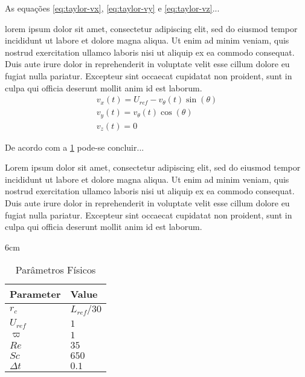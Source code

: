 As equações \eqref{eq:taylor-vx}, \eqref{eq:taylor-vy} e \eqref{eq:taylor-vz}...

lorem ipsum dolor sit amet, consectetur adipiscing elit, sed do eiusmod tempor incididunt ut labore et dolore magna aliqua. Ut enim ad minim veniam, quis nostrud exercitation ullamco laboris nisi ut aliquip ex ea commodo consequat. Duis aute irure dolor in reprehenderit in voluptate velit esse cillum dolore eu fugiat nulla pariatur. Excepteur sint occaecat cupidatat non proident, sunt in culpa qui officia deserunt mollit anim id est laborum.
%
\begin{subequations}
\begin{gather}
v_x(t) =  U_{ref} - v_{\theta}(t)\sin(\theta) \label{eq:taylor-vx} \\
v_y(t) =  v_{\theta}(t)\cos(\theta) \label{eq:taylor-vy} \\
v_z(t) = 0  \label{eq:taylor-vz}
\end{gather}
\end{subequations}

De acordo com a \ref{tbl:taylor-vortex-parameters} pode-se concluir...
 
Lorem ipsum dolor sit amet, consectetur adipiscing elit, sed do eiusmod tempor incididunt ut labore et dolore magna aliqua. Ut enim ad minim veniam, quis nostrud exercitation ullamco laboris nisi ut aliquip ex ea commodo consequat. Duis aute irure dolor in reprehenderit in voluptate velit esse cillum dolore eu fugiat nulla pariatur. Excepteur sint occaecat cupidatat non proident, sunt in culpa qui officia deserunt mollit anim id est laborum.
%
\begin{table}[h]{6cm}
\caption{Parâmetros Físicos}
\label{tbl:taylor-vortex-parameters}
\begin{tabular}{ll}
\hline
Parameter & Value \\
\hline
$ r_c $          	 & $ L_{ref}/30 $ \\
$ U_{ref} $          & $ 1 $	      \\
$ \varpi $           & $ 1 $		  \\
$ Re $               & $ 35 $  		  \\
$ Sc $               & $ 650 $  	  \\
$ \Delta t $         & $ 0.1 $        \\
\hline
\end{tabular}
\end{table}


